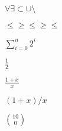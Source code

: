 
\( \forall \exists \subset \cup \setminus \)

\( \le \ge \le \ge \le  \)

\( \sum_{i=0}^{n} 2^{i}  \)

\( \frac{1}{2} \)

\( \frac{1+x}{x} \)

\( (1+x) / x \)

\( \binom{10}{0} \)



